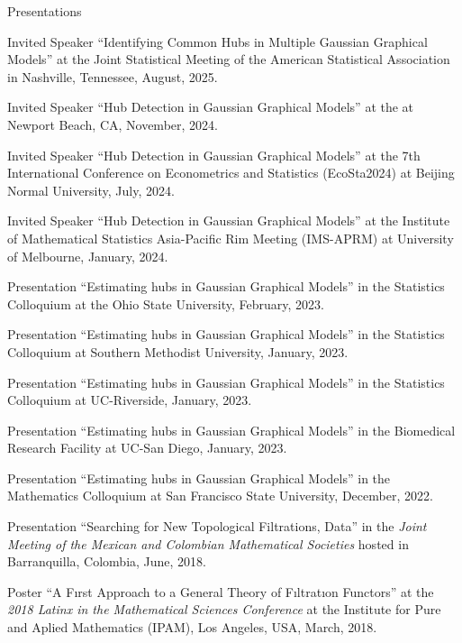 \documentclass{resume_customized} %
\begin{document}
\begin{rSection}{Presentations}
	\vspace{-1em}
	\begin{rSubsection}{}{}{}{}
		\item Invited Speaker ``Identifying Common Hubs in Multiple Gaussian Graphical Models'' at the Joint Statistical Meeting of the American Statistical Association in Nashville, Tennessee, August, 2025.
		\item Invited Speaker ``Hub Detection in Gaussian Graphical Models'' at the at Newport Beach, CA, November, 2024.
		\item Invited Speaker ``Hub Detection in Gaussian Graphical Models'' at the 7th International Conference on Econometrics and Statistics (EcoSta2024) at Beijing Normal University, July, 2024.
		\item Invited Speaker ``Hub Detection in Gaussian Graphical Models'' at the Institute of Mathematical Statistics Asia-Pacific Rim Meeting (IMS-APRM) at University of Melbourne, January, 2024.
		\item Presentation ``Estimating hubs in Gaussian Graphical Models'' in the Statistics Colloquium at the Ohio State University, February, 2023.
		\item Presentation ``Estimating hubs in Gaussian Graphical Models'' in the Statistics Colloquium at Southern Methodist University, January, 2023.
		\item Presentation ``Estimating hubs in Gaussian Graphical Models'' in the Statistics Colloquium at UC-Riverside, January, 2023.
		\item Presentation ``Estimating hubs in Gaussian Graphical Models'' in the Biomedical Research Facility at UC-San Diego, January, 2023.
		\item Presentation ``Estimating hubs in Gaussian Graphical Models'' in the Mathematics Colloquium at San Francisco State University, December, 2022.
		\item Presentation ``Searching for New Topological Filtrations, Data'' in the {\it Joint Meeting of the Mexican and Colombian Mathematical Societies} hosted in Barranquilla, Colombia, June, 2018.
		\item Poster ``A Fırst Approach to a General Theory of Fıltratıon Functors'' at the {\it 2018 Latinx in the Mathematical Sciences Conference} at the Institute for Pure and Aplied Mathematics (IPAM), Los Angeles, USA, March, 2018.
	\end{rSubsection}


\end{rSection}
\end{document}
